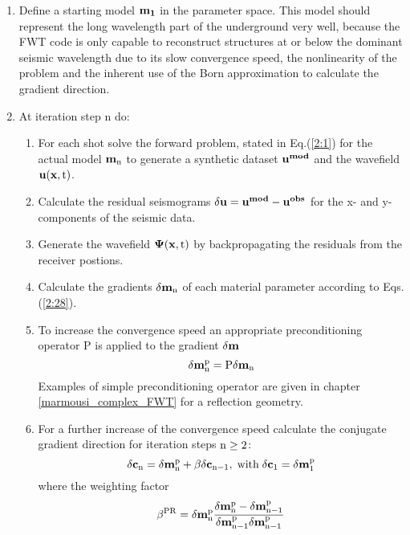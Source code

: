 \begin{enumerate}
\item Define a starting model $\rm{\mathbf{m_1}}$ in the parameter space. This model should represent the long wavelength part of the underground 
very well, because the FWT code is only capable to reconstruct structures at or below the dominant seismic wavelength due to its slow 
convergence speed, the nonlinearity of the problem and the inherent use of the Born approximation to calculate the gradient direction.
\item At iteration step n do:
\begin{enumerate} 
\item For each shot solve the forward problem, stated in Eq.(\ref{2:1}) for the actual model $\rm{\mathbf{m}_n}$ to generate a synthetic dataset 
      $\rm{\mathbf{u^{mod}}}$ and the wavefield $\rm{\mathbf{u}(\mathbf{x},t)}$. 
\item Calculate the residual seismograms $\rm{\delta \mathbf{u} = \mathbf{u^{mod}} - \mathbf{u^{obs}}}$ for the x- and y-components of the
seismic data.
\item Generate the wavefield $\rm{\mathbf{\Psi}(\mathbf{x},t)}$ by backpropagating the residuals from the receiver postions.
\item Calculate the gradients $\rm{\delta \mathbf{m}_n}$ of each material parameter according to Eqs.(\ref{2:28}).
\item To increase the convergence speed an appropriate preconditioning operator P is applied to the gradient $\rm{\delta \mathbf{m}}$
\begin{equation}
\rm{\delta \mathbf{m}^p_n = P \delta \mathbf{m}_n}
\label{2:26:1} 
\end{equation}
Examples of simple preconditioning operator are given in chapter \ref{marmousi_complex_FWT} for a reflection geometry. 
\item For a further increase of the convergence speed calculate the conjugate gradient direction for iteration steps $\rm{n \ge 2}$: 
\begin{equation}
\rm{\delta \mathbf{c}_n = \delta \mathbf{m}^p_n + \beta \delta \mathbf{c}_{n-1}},\; \rm{\text{with}}\; \rm{\delta \mathbf{c}_{1} = \delta
\mathbf{m}^p_1}  
\label{2:26:2}
\end{equation}
where the weighting factor 
\begin{equation}
\rm{\beta^{PR}=\delta \mathbf{m}^p_n \frac{\delta \mathbf{m}^p_n - \delta \mathbf{m}^p_{n-1}}{\delta \mathbf{m}^p_{n-1} \delta \mathbf{m}^p_{n-1}}}
\label{FWT_alg:1}

\end{equation}
\end{enumerate}
\end{enumerate}
